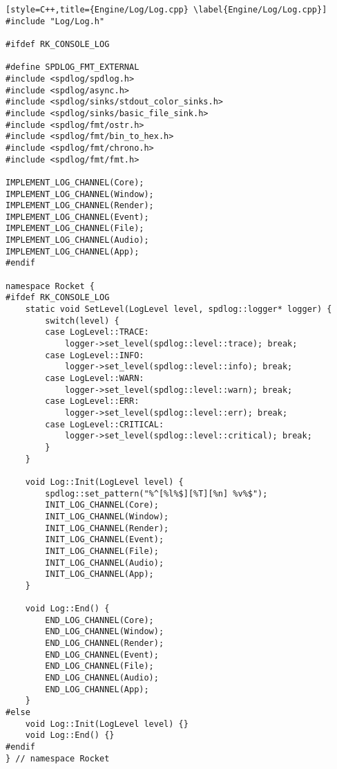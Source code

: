 \begin{lstlisting}[style=C++,title={Engine/Log/Log.cpp} \label{Engine/Log/Log.cpp}]
#include "Log/Log.h"

#ifdef RK_CONSOLE_LOG

#define SPDLOG_FMT_EXTERNAL
#include <spdlog/spdlog.h>
#include <spdlog/async.h>
#include <spdlog/sinks/stdout_color_sinks.h>
#include <spdlog/sinks/basic_file_sink.h>
#include <spdlog/fmt/ostr.h>
#include <spdlog/fmt/bin_to_hex.h>
#include <spdlog/fmt/chrono.h>
#include <spdlog/fmt/fmt.h>

IMPLEMENT_LOG_CHANNEL(Core);
IMPLEMENT_LOG_CHANNEL(Window);
IMPLEMENT_LOG_CHANNEL(Render);
IMPLEMENT_LOG_CHANNEL(Event);
IMPLEMENT_LOG_CHANNEL(File);
IMPLEMENT_LOG_CHANNEL(Audio);
IMPLEMENT_LOG_CHANNEL(App);
#endif

namespace Rocket {
#ifdef RK_CONSOLE_LOG
    static void SetLevel(LogLevel level, spdlog::logger* logger) {
        switch(level) {
        case LogLevel::TRACE:
            logger->set_level(spdlog::level::trace); break;
        case LogLevel::INFO:
            logger->set_level(spdlog::level::info); break;
        case LogLevel::WARN:
            logger->set_level(spdlog::level::warn); break;
        case LogLevel::ERR:
            logger->set_level(spdlog::level::err); break;
        case LogLevel::CRITICAL:
            logger->set_level(spdlog::level::critical); break;
        }
    }

    void Log::Init(LogLevel level) {
        spdlog::set_pattern("%^[%l%$][%T][%n] %v%$");
        INIT_LOG_CHANNEL(Core);
        INIT_LOG_CHANNEL(Window);
        INIT_LOG_CHANNEL(Render);
        INIT_LOG_CHANNEL(Event);
        INIT_LOG_CHANNEL(File);
        INIT_LOG_CHANNEL(Audio);
        INIT_LOG_CHANNEL(App);
    }

    void Log::End() {
        END_LOG_CHANNEL(Core);
        END_LOG_CHANNEL(Window);
        END_LOG_CHANNEL(Render);
        END_LOG_CHANNEL(Event);
        END_LOG_CHANNEL(File);
        END_LOG_CHANNEL(Audio);
        END_LOG_CHANNEL(App);
    }
#else
    void Log::Init(LogLevel level) {}
    void Log::End() {}
#endif
} // namespace Rocket
\end{lstlisting}